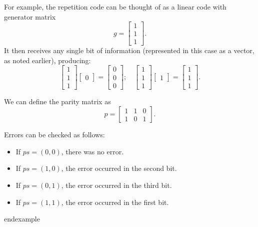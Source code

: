\begin{example}\label{first_example_linear_code}
For example, the repetition code can be thought of as a linear code with generator matrix
\begin{equation}
g = \begin{bmatrix}1 \\ 1 \\ 1\end{bmatrix}.
\end{equation}
It then receives any single bit of information (represented in this case as a vector, as noted earlier), producing:
\begin{equation}
\begin{bmatrix}1 \\ 1 \\ 1\end{bmatrix} \begin{bmatrix} 0 \end{bmatrix} = \begin{bmatrix} 0 \\ 0 \\ 0 \end{bmatrix};\quad \begin{bmatrix}1 \\ 1 \\ 1\end{bmatrix} \begin{bmatrix} 1 \end{bmatrix} = \begin{bmatrix} 1 \\ 1 \\ 1 \end{bmatrix}.
\end{equation}

We can define the parity matrix as
\begin{equation}
p = \begin{bmatrix}1 & 1 & 0 \\ 1 & 0 & 1\end{bmatrix}.
\end{equation}

Errors can be checked as follows:

\begin{itemize}
\item If $p s = (0, 0)$, there was no error.
\item If $p s = (1, 0)$, the error occurred in the second bit.
\item If $p s = (0, 1)$, the error occurred in the third bit.
\item If $p s = (1, 1)$, the error occurred in the first bit.
\end{itemize}
\end{example}
end{example}

